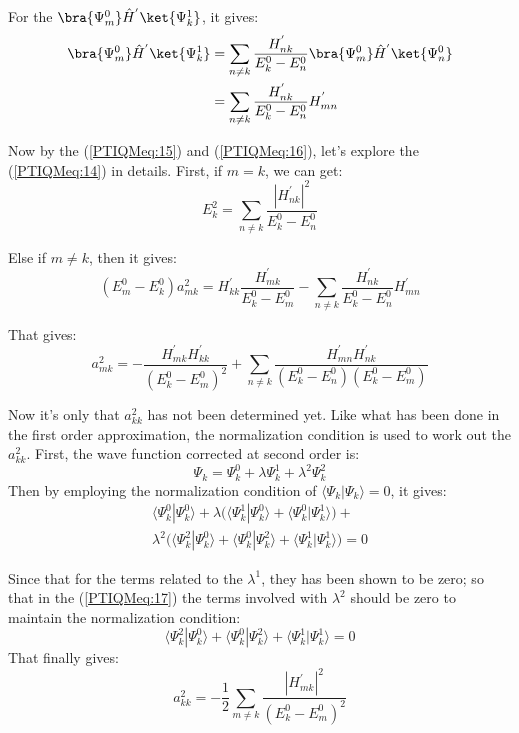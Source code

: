 For the $\bra{\Psi^{0}_{m}}\hat{H}^{'}\ket{\Psi^{1}_{k}}$, it gives:
\begin{align}\label{PTIQMeq:16}
\bra{\Psi^{0}_{m}}\hat{H}^{'}\ket{\Psi^{1}_{k}} &= \sum_{n\neq
k}\frac{H^{'}_{nk}}{E^{0}_{k} -
E^{0}_{n}}\bra{\Psi^{0}_{m}}\hat{H}^{'}\ket{\Psi^{0}_{n}} \nonumber
\\
&=\sum_{n\neq k}\frac{H^{'}_{nk}}{E^{0}_{k} - E^{0}_{n}}H^{'}_{mn}
\end{align}

Now by the (\ref{PTIQMeq:15}) and (\ref{PTIQMeq:16}), let's explore
the (\ref{PTIQMeq:14}) in details. First, if $m=k$, we can get:
\begin{equation}\label{}
E^{2}_{k} = \sum_{n\neq k}\frac{|H^{'}_{nk}|^{2}}{E^{0}_{k} -
E^{0}_{n}}
\end{equation}

Else if $m \neq k$, then it gives:
\begin{equation}\label{}
(E^{0}_{m} - E^{0}_{k})a^{2}_{mk} =
H^{'}_{kk}\frac{H^{'}_{mk}}{E^{0}_{k} - E^{0}_{m}} - \sum_{n\neq
k}\frac{H^{'}_{nk}}{E^{0}_{k} - E^{0}_{n}}H^{'}_{mn}
\end{equation}

That gives:
\begin{equation}\label{}
a^{2}_{mk} = -\frac{H^{'}_{mk}H^{'}_{kk}}{(E^{0}_{k} -
E^{0}_{m})^{2}} + \sum_{n\neq
k}\frac{H^{'}_{mn}H^{'}_{nk}}{(E^{0}_{k} - E^{0}_{n})(E^{0}_{k} -
E^{0}_{m})}
\end{equation}

Now it's only that $a^{2}_{kk}$ has not been determined yet. Like
what has been done in the first order approximation, the
normalization condition is used to work out the $a^{2}_{kk}$. First,
the wave function corrected at second order is:
\begin{equation}\label{}
\Psi_{k} = \Psi_{k}^{0} + \lambda\Psi_{k}^{1} +
\lambda^{2}\Psi_{k}^{2}
\end{equation}
Then by employing the normalization condition of
$\langle\Psi_{k}|\Psi_{k}\rangle = 0$, it gives:
\begin{multline}\label{PTIQMeq:17}
\langle\Psi_{k}^{0}|\Psi_{k}^{0}\rangle +
\lambda\Big(\langle\Psi_{k}^{1}|\Psi_{k}^{0}\rangle +
\langle\Psi_{k}^{0}|\Psi_{k}^{1}\rangle\Big) + \\
\lambda^{2}\Big(\langle\Psi_{k}^{2}|\Psi_{k}^{0}\rangle +
\langle\Psi_{k}^{0}|\Psi_{k}^{2}\rangle +
\langle\Psi_{k}^{1}|\Psi_{k}^{1}\rangle\Big) = 0
\end{multline}

Since that for the terms related to the $\lambda^{1}$, they has been
shown to be zero; so that in the (\ref{PTIQMeq:17}) the terms
involved with $\lambda^{2}$ should be zero to maintain the
normalization condition:
\begin{equation}\label{}
\langle\Psi_{k}^{2}|\Psi_{k}^{0}\rangle +
\langle\Psi_{k}^{0}|\Psi_{k}^{2}\rangle +
\langle\Psi_{k}^{1}|\Psi_{k}^{1}\rangle = 0
\end{equation}
That finally gives:
\begin{equation}\label{}
a^{2}_{kk} = -\frac{1}{2}\sum_{m\neq
k}\frac{|H^{'}_{mk}|^{2}}{(E^{0}_{k} - E^{0}_{m})^{2}}
\end{equation}

